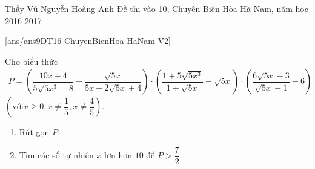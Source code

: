 \begin{name}
{Thầy Vũ Nguyễn Hoàng Anh}
{Đề thi vào 10, Chuyên Biên Hòa Hà Nam, năm học 2016-2017}
\end{name}
\setcounter{ex}{0}
[ans/ans9DT16-ChuyenBienHoa-HaNam-V2]

\begin{ex}%
Cho biểu thức
\begin{align*}
P= \left(\dfrac{10x+4}{5\sqrt{5x^3}-8} - \dfrac{\sqrt{5x}}{5x+2\sqrt{5x} +4 } \right) \cdot \left( \dfrac{1+5\sqrt{5x^3}}{1+\sqrt{5x}} - \sqrt{5x}\right) \cdot \left( \dfrac{6\sqrt{5x}-3}{\sqrt{5x}-1} - 6\right)
\end{align*}
$\left(\text{với} x\ge 0, x\ne \dfrac{1}{5}, x\ne \dfrac{4}{5} \right)$.
\begin{enumerate}
\item Rút gọn $P$.
\item Tìm các số tự nhiên $x$ lơn hơn $10$ để $P>\dfrac{7}{2}$.
\end{enumerate}
\end{ex}

